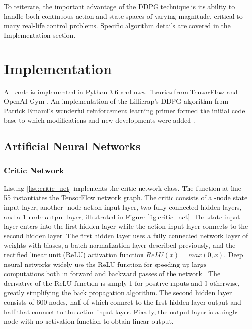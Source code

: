 To reiterate, the important advantage of the DDPG technique is its ability to handle both continuous action and state spaces of varying magnitude, critical to many real-life control problems. Specific algorithm details are covered in the Implementation section.

\section{Implementation}
All code is implemented in Python 3.6 and uses libraries from TensorFlow \cite{tensorflow} and OpenAI Gym \cite{openaigym}. An implementation of the Lillicrap's DDPG algorithm from Patrick Emami's wonderful reinforcement learning primer formed the initial code base to which modifications and new developments were added \cite{emami_2016}.

\subsection{Artificial Neural Networks}
\subsubsection{Critic Network}
Listing \ref{list:critic_net} implements the critic network class. The function  at line 55 instantiates the TensorFlow network graph. The critic consists of a -node state input layer, another -node action input layer, two fully connected hidden layers, and a 1-node output layer, illustrated in Figure \ref{fig:critic_net}. The state input layer enters into the first hidden layer while the action input layer connects to the second hidden layer. The first hidden layer uses a fully connected network layer of weights with biases, a batch normalization layer described previously, and the rectified linear unit (ReLU) activation function $ReLU(x) = max(0,x)$. Deep neural networks widely use the ReLU function for speeding up large computations both in forward and backward passes of the network \cite{2017arXiv171005941R}. The derivative of the ReLU function is simply 1 for positive inputs and 0 otherwise, greatly simplifying the back propagation algorithm. The second hidden layer consists of 600 nodes, half of which connect to the first hidden layer output and half that connect to the action input layer. Finally, the output layer is a single node with no activation function to obtain linear output.

